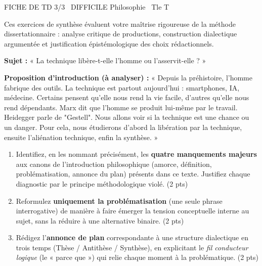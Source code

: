 \documentclass[11pt]{article}
\begin{document}
\begin{tcolorbox}[enhanced,colback=popink,colframe=popink,arc=10pt,boxrule=0pt,left=12pt,right=12pt,top=9pt,bottom=9pt]
{\color{white}\popxbold\small FICHE DE TD 3/3 \textbullet\ DIFFICILE \hfill Philosophie \textbullet\ Tle T\par}
\end{tcolorbox}
\vspace{4pt}
\noindent Ces exercices de synthèse évaluent votre maîtrise rigoureuse de la méthode dissertationnaire : analyse critique de productions, construction dialectique argumentée et justification épistémologique des choix rédactionnels.

\begin{exercice}
\textbf{Sujet :} « La technique libère-t-elle l'homme ou l'asservit-elle ? »

\textbf{Proposition d'introduction (à analyser) :}
« Depuis la préhistoire, l'homme fabrique des outils. La technique est partout aujourd'hui : smartphones, IA, médecine. Certains pensent qu'elle nous rend la vie facile, d'autres qu'elle nous rend dépendants. Marx dit que l'homme se produit lui-même par le travail. Heidegger parle de "Gestell". Nous allons voir si la technique est une chance ou un danger. Pour cela, nous étudierons d'abord la libération par la technique, ensuite l'aliénation technique, enfin la synthèse. »

\begin{enumerate}
    \item Identifiez, en les nommant précisément, les \textbf{quatre manquements majeurs} aux canons de l'introduction philosophique (amorce, définition, problématisation, annonce du plan) présents dans ce texte. Justifiez chaque diagnostic par le principe méthodologique violé. (2 pts)
    \item Reformulez \textbf{uniquement la problématisation} (une seule phrase interrogative) de manière à faire émerger la tension conceptuelle interne au sujet, sans la réduire à une alternative binaire. (2 pts)
    \item Rédigez l'\textbf{annonce de plan} correspondante à une structure dialectique en trois temps (Thèse / Antithèse / Synthèse), en explicitant le \textit{fil conducteur logique} (le « parce que ») qui relie chaque moment à la problématique. (2 pts)
\end{enumerate}
\end{exercice}
\end{document}
